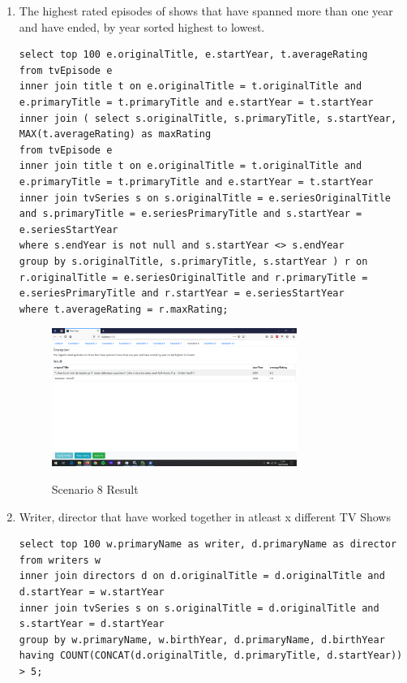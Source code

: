\documentclass{sig-alternate}
\begin{document}
\begin{enumerate}
\begin{figure}[ht]
	        \end{figure}
		\item The highest rated episodes of shows that have spanned more than one year and have ended, by year sorted highest to lowest.
                \begin{lstlisting}
select top 100 e.originalTitle, e.startYear, t.averageRating
from tvEpisode e
inner join title t on e.originalTitle = t.originalTitle and e.primaryTitle = t.primaryTitle and e.startYear = t.startYear
inner join ( select s.originalTitle, s.primaryTitle, s.startYear, MAX(t.averageRating) as maxRating
from tvEpisode e
inner join title t on e.originalTitle = t.originalTitle and e.primaryTitle = t.primaryTitle and e.startYear = t.startYear
inner join tvSeries s on s.originalTitle = e.seriesOriginalTitle and s.primaryTitle = e.seriesPrimaryTitle and s.startYear = e.seriesStartYear
where s.endYear is not null and s.startYear <> s.endYear
group by s.originalTitle, s.primaryTitle, s.startYear ) r on r.originalTitle = e.seriesOriginalTitle and r.primaryTitle = e.seriesPrimaryTitle and r.startYear = e.seriesStartYear
where t.averageRating = r.maxRating;
                \end{lstlisting}
         	\begin{figure}[ht]
		    \includegraphics[width=8cm]{Screenshots/Scenario8.png}
		    \label{frontend}
                    \caption{Scenario 8 Result}
		    \centering
	        \end{figure}
		\item Writer, director that have worked together in atleast x different TV Shows
                \begin{lstlisting}
select top 100 w.primaryName as writer, d.primaryName as director
from writers w
inner join directors d on d.originalTitle = d.originalTitle and d.startYear = w.startYear
inner join tvSeries s on s.originalTitle = d.originalTitle and s.startYear = d.startYear
group by w.primaryName, w.birthYear, d.primaryName, d.birthYear
having COUNT(CONCAT(d.originalTitle, d.primaryTitle, d.startYear)) > 5;
                \end{lstlisting}

\end{enumerate}
\end{document}

